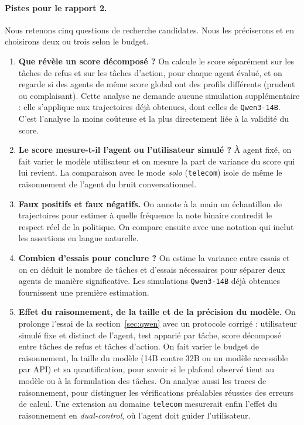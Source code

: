 \paragraph{Pistes pour le rapport 2.} Nous retenons cinq questions de recherche candidates. Nous les préciserons et en choisirons deux ou trois selon le budget.
\begin{enumerate}[nosep]
  \item \textbf{Que révèle un score décomposé ?} On calcule le score séparément sur les tâches de refus et sur les tâches d'action, pour chaque agent évalué, et on regarde si des agents de même score global ont des profils différents (prudent ou complaisant). Cette analyse ne demande aucune simulation supplémentaire : elle s'applique aux trajectoires déjà obtenues, dont celles de \texttt{Qwen3-14B}. C'est l'analyse la moins coûteuse et la plus directement liée à la validité du score.
  \item \textbf{Le score mesure-t-il l'agent ou l'utilisateur simulé ?} À agent fixé, on fait varier le modèle utilisateur et on mesure la part de variance du score qui lui revient. La comparaison avec le mode \emph{solo} (\texttt{telecom}) isole de même le raisonnement de l'agent du bruit conversationnel.
  \item \textbf{Faux positifs et faux négatifs.} On annote à la main un échantillon de trajectoires pour estimer à quelle fréquence la note binaire contredit le respect réel de la politique. On compare ensuite avec une notation qui inclut les assertions en langue naturelle.
  \item \textbf{Combien d'essais pour conclure ?} On estime la variance entre essais et on en déduit le nombre de tâches et d'essais nécessaires pour séparer deux agents de manière significative. Les simulations \texttt{Qwen3-14B} déjà obtenues fournissent une première estimation.
  \item \textbf{Effet du raisonnement, de la taille et de la précision du modèle.} On prolonge l'essai de la section~\ref{sec:qwen} avec un protocole corrigé : utilisateur simulé fixe et distinct de l'agent, test apparié par tâche, score décomposé entre tâches de refus et tâches d'action. On fait varier le budget de raisonnement, la taille du modèle (14B contre 32B ou un modèle accessible par API) et sa quantification, pour savoir si le plafond observé tient au modèle ou à la formulation des tâches. On analyse aussi les traces de raisonnement, pour distinguer les vérifications préalables réussies des erreurs de calcul. Une extension au domaine \texttt{telecom} mesurerait enfin l'effet du raisonnement en \emph{dual-control}, où l'agent doit guider l'utilisateur.
\end{enumerate}
